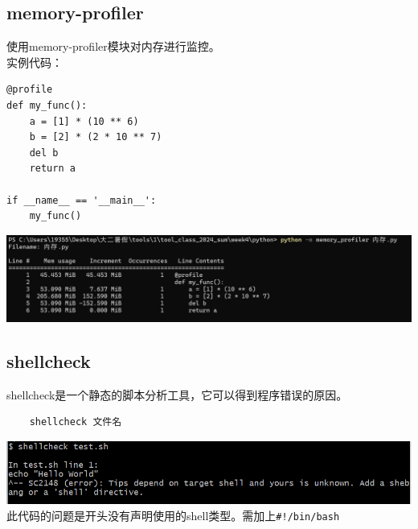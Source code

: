 \documentclass[UTF8,a4paper]{ctexart}
\begin{document}
\subsection{memory-profiler}
使用memory-profiler模块对内存进行监控。\\
实例代码：
\begin{lstlisting}
@profile
def my_func():
    a = [1] * (10 ** 6)
    b = [2] * (2 * 10 ** 7)
    del b
    return a

if __name__ == '__main__':
    my_func()
\end{lstlisting}
\includegraphics[width=1\textwidth]{./pictures/内存.png}

\subsection{shellcheck}
shellcheck是一个静态的脚本分析工具，它可以得到程序错误的原因。
\begin{lstlisting}
    shellcheck 文件名
\end{lstlisting}
\includegraphics[width=1\textwidth]{./pictures/shellcheck1.png}
此代码的问题是开头没有声明使用的shell类型。需加上\verb|#!/bin/bash|
\end{document}
